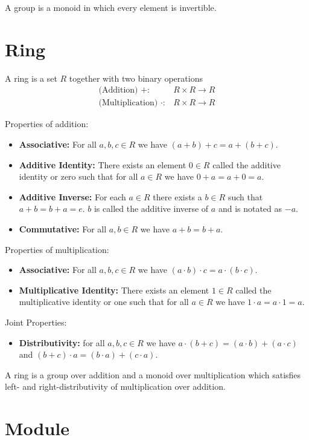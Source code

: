 \documentclass[12pt]{article}
\begin{document}
A group is a monoid in which every element is invertible.

\section{Ring}

A ring is a set $R$ together with two binary operations 
\begin{align}
\text{(Addition) } +:& R\times R \rightarrow R\\
\text{(Multiplication) } \cdot:& R\times R \rightarrow R
\end{align}

Properties of addition: 
\begin{itemize}
\item{\textbf{Associative:} For all $a, b, c \in R$ we have $(a+b)+c = a+(b+c)$.}
\item{\textbf{Additive Identity:} There exists an element $0\in R$ called the additive identity or zero such that for all $a \in R$ we have $0+a = a+0 = a$.}
\item{\textbf{Additive Inverse:} For each $a\in R$ there exists a $b \in R$ such that $a + b = b + a = e$. $b$ is called the additive inverse of $a$ and is notated as $-a$.}
\item{\textbf{Commutative:} For all $a, b \in R$ we have $a+b = b+a$.}
\end{itemize}

Properties of multiplication:
\begin{itemize}
\item{\textbf{Associative:} For all $a, b, c \in R$ we have $(a\cdot b)\cdot c = a\cdot(b\cdot c)$.}
\item{\textbf{Multiplicative Identity:} There exists an element $1\in R$ called the multiplicative identity or one such that for all $a\in R$ we have $1\cdot a = a \cdot 1 = a$.}
\end{itemize}

Joint Properties:
\begin{itemize}
\item{\textbf{Distributivity:} for all $a, b, c \in R$ we have $a\cdot(b+c)= (a\cdot b) + (a\cdot c)$ and $(b+c)\cdot a = (b\cdot a) + (c\cdot a)$.}
\end{itemize}

A ring is a group over addition and a monoid over multiplication which satisfies left- and right-distributivity of multiplication over addition.

\section{Module}
\end{document}
